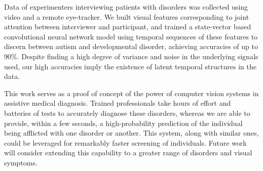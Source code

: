 \documentclass[10pt,twocolumn,letterpaper]{article}
\begin{document}
Data of experimenters interviewing patients with disorders was collected using video and a remote eye-tracker. We built visual features corresponding to joint attention between interviewer and participant, and trained a state-vector based convolutional neural network model using temporal sequences of these features to discern between autism and developmental disorder, achieving accuracies of up to 90\%. Despite finding a high degree of variance and noise in the underlying signals used, our high accuracies imply the existence of latent temporal structures in the data. 


This work serves as a proof of concept of the power of computer vision systems in assistive medical diagnosis. Trained professionals take hours of effort and batteries of tests to accurately diagnose these disorders, whereas we are able to provide, within a few seconds, a high-probability prediction of the individual being afflicted with one disorder or another. This system, along with similar ones, could be leveraged for remarkably faster screening of individuals. Future work will consider extending this capability to a greater range of disorders and visual symptoms.


{\small


}
\end{document}
